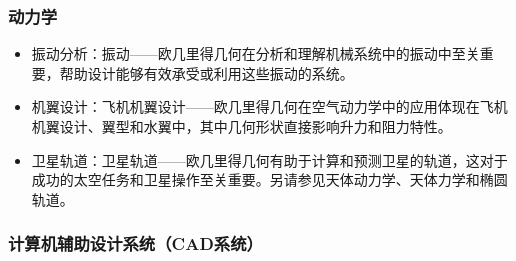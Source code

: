 \subsubsection{动力学}
\begin{itemize}
\item 振动分析：振动——欧几里得几何在分析和理解机械系统中的振动中至关重要，帮助设计能够有效承受或利用这些振动的系统。
\item 机翼设计：飞机机翼设计——欧几里得几何在空气动力学中的应用体现在飞机机翼设计、翼型和水翼中，其中几何形状直接影响升力和阻力特性。
\item 卫星轨道：卫星轨道——欧几里得几何有助于计算和预测卫星的轨道，这对于成功的太空任务和卫星操作至关重要。另请参见天体动力学、天体力学和椭圆轨道。
\end{itemize}
\subsubsection{计算机辅助设计系统（CAD系统）}
